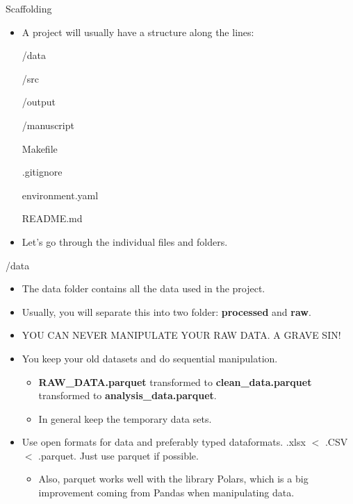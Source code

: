 \documentclass{beamer}
\begin{document}
\begin{frame}{Scaffolding}
\begin{itemize}
    \item A project will usually have a structure along the lines: \begin{semiverbatim}
    
/data

/src

/output

/manuscript

Makefile

.gitignore

environment.yaml

README.md
\end{semiverbatim}   
\item Let's go through the individual files and folders.
\end{itemize}
 
\end{frame}

\begin{frame}{/data}

\begin{itemize}
    \item The data folder contains all the data used in the project.
    \item Usually, you will separate this into two folder: \textbf{processed} and \textbf{raw}.
    \item YOU CAN NEVER MANIPULATE YOUR RAW DATA. A GRAVE SIN!
    \item You keep your old datasets and do sequential manipulation.
    \begin{itemize}
        \item \textbf{RAW\_DATA.parquet} transformed to \textbf{clean\_data.parquet} transformed to \textbf{analysis\_data.parquet}.
        \item In general keep the temporary data sets.
    \end{itemize}
    \item Use open formats for data and preferably typed dataformats. .xlsx $<$ .CSV $<$  .parquet. Just use parquet if possible.
    \begin{itemize}
        \item Also, parquet works well with the library Polars, which is a big improvement coming from Pandas when manipulating data.
    \end{itemize}
\end{itemize}
    
\end{frame}
\end{document}

